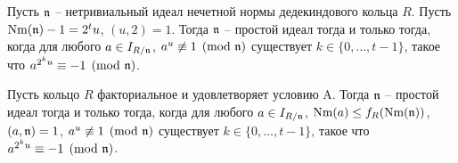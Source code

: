 \documentclass[_00_dissertation.tex]{subfiles}
\begin{document}
\begin{theorem}\label{theorem:miller_criteria}
    Пусть $\mathfrak{n}$ -- нетривиальный идеал нечетной нормы дедекиндового кольца $R$.
    Пусть $\textrm{Nm}(\mathfrak{n}) - 1 = 2^t u$, $(u, 2) = 1$.
    Тогда $\mathfrak{n}$ -- простой идеал тогда и только тогда, когда для любого $a \in I_{R/\mathfrak{n}}$, $a^u \not\equiv 1 \pmod{\mathfrak{n}}$ существует $k\in \{0, \dots, t-1\}$, такое что $a^{2^{k}u} \equiv -1 \pmod{\mathfrak{n}}$.

    Пусть кольцо $R$ факториальное и удовлетворяет условию A.
    Тогда $\mathfrak{n}$ -- простой идеал тогда и только тогда, когда для любого $a \in I_{R/\mathfrak{n}}$, $\textrm{Nm}(a) \le f_R(\textrm{Nm}(\mathfrak{n}))$, $(a, \mathfrak{n}) = 1$, $a^u \not\equiv 1 \pmod{\mathfrak{n}}$ существует $k\in \{0, \dots, t-1\}$, такое что $a^{2^{k}u} \equiv -1 \pmod{\mathfrak{n}}$.
\end{theorem}
\end{document}

